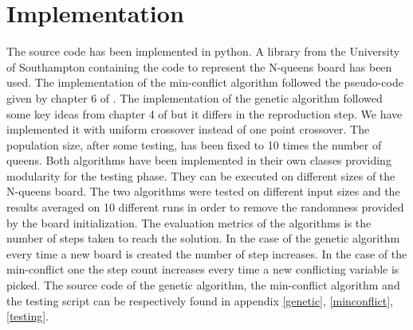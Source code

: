 \documentclass[runningheads]{llncs}
\begin{document}
\section{Implementation}
The source code has been implemented in python. A library from the
University of Southampton containing the code to represent the
N-queens board has been used. The implementation of the min-conflict
algorithm followed the pseudo-code given by chapter 6 of
\cite{russel2016artificial}. The implementation of the genetic
algorithm followed some key ideas from chapter 4 of
\cite{russel2016artificial} but it differs in the reproduction
step. We have implemented it with uniform crossover instead of one
point crossover. The population size, after some testing, has been
fixed to 10 times the number of queens. Both algorithms have been
implemented in their own classes providing modularity for the testing
phase. They can be executed on different sizes of the N-queens
board. The two algorithms were tested on different input sizes and the
results averaged on 10 different runs in order to remove the
randomness provided by the board initialization. The evaluation
metrics of the algorithms is the number of steps taken to reach the
solution. In the case of the genetic algorithm every time a new board
is created the number of step increases. In the case of the
min-conflict one the step count increases every time a new conflicting
variable is picked. The source code of the genetic algorithm, the
min-conflict algorithm and the testing script can be respectively found in appendix
\ref{genetic}, \ref{minconflict}, \ref{testing}.
\end{document}
